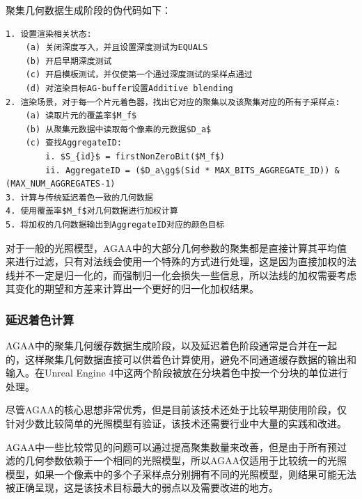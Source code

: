 聚集几何数据生成阶段的伪代码如下：

\begin{lstlisting}[mathescape=true]
1. 设置渲染相关状态:
	(a) 关闭深度写入，并且设置深度测试为EQUALS
	(b) 开启早期深度测试
	(c) 开启模板测试，并仅使第一个通过深度测试的采样点通过
	(d) 对渲染目标AG-buffer设置Additive blending
2. 渲染场景，对于每一个片元着色器，找出它对应的聚集以及该聚集对应的所有子采样点:
	(a) 读取片元的覆盖率$M_f$ 
	(b) 从聚集元数据中读取每个像素的元数据$D_a$
	(c) 查找AggregateID:
		i. $S_{id}$ = firstNonZeroBit($M_f$)
		ii. AggregateID = ($D_a\gg$(Sid * MAX_BITS_AGGREGATE_ID)) & (MAX_NUM_AGGREGATES-1)
3. 计算与传统延迟着色一致的几何数据
4. 使用覆盖率$M_f$对几何数据进行加权计算
5. 将加权的几何数据输出到AggregateID对应的颜色目标
\end{lstlisting}

对于一般的光照模型，AGAA中的大部分几何参数的聚集都是直接计算其平均值来进行过滤，只有对法线会使用一个特殊的方式\cite{a:Mipmappingnormalmaps}进行处理，这是因为直接加权的法线并不一定是归一化的，而强制归一化会损失一些信息，所以法线的加权需要考虑其变化的期望和方差来计算出一个更好的归一化加权结果。





\subsubsection{延迟着色计算}
AGAA中的聚集几何缓存数据生成阶段，以及延迟着色阶段通常是合并在一起的，这样聚集几何数据直接可以供着色计算使用，避免不同通道缓存数据的输出和输入。在Unreal Engine 4\cite{a:AggregateG-BufferAnti-AliasinginUnrealEngine4}中这两个阶段被放在分块着色中按一个分块的单位进行处理。

尽管AGAA的核心思想非常优秀，但是目前该技术还处于比较早期使用阶段，仅针对少数比较简单的光照模型有验证，该技术还需要行业中大量的实践和改进。

AGAA中一些比较常见的问题可以通过提高聚集数量来改善，但是由于所有预过滤的几何参数依赖于一个相同的光照模型，所以AGAA仅适用于比较统一的光照模型，如果一个像素中的多个子采样点分别拥有不同的光照模型，则结果可能无法被正确呈现，这是该技术目标最大的弱点以及需要改进的地方。

